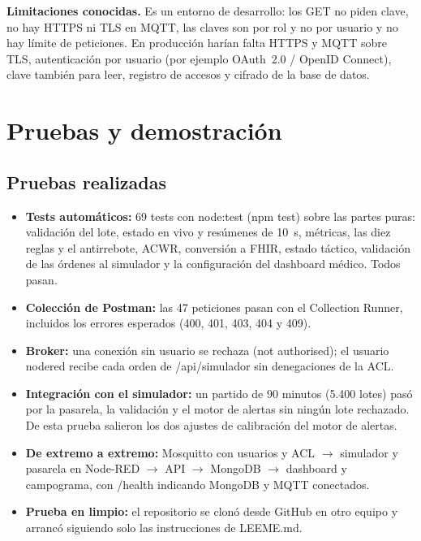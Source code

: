 \documentclass[runningheads]{llncs}
\begin{document}
\textbf{Limitaciones conocidas.} Es un entorno de desarrollo: los GET no piden clave, no hay HTTPS ni TLS en MQTT, las claves son por rol y no por usuario y no hay límite de peticiones. En producción harían falta HTTPS y MQTT sobre TLS, autenticación por usuario (por ejemplo OAuth~2.0 / OpenID Connect), clave también para leer, registro de accesos y cifrado de la base de datos.

\section{Pruebas y demostración}

\subsection{Pruebas realizadas}

\begin{itemize}
  \item \textbf{Tests automáticos:} 69 tests con node:test (npm test) sobre las partes puras: validación del lote, estado en vivo y resúmenes de 10~s, métricas, las diez reglas y el antirrebote, ACWR, conversión a FHIR, estado táctico, validación de las órdenes al simulador y la configuración del dashboard médico. Todos pasan.
  \item \textbf{Colección de Postman:} las 47 peticiones pasan con el Collection Runner, incluidos los errores esperados (400, 401, 403, 404 y 409).
  \item \textbf{Broker:} una conexión sin usuario se rechaza (not authorised); el usuario nodered recibe cada orden de /api/simulador sin denegaciones de la ACL.
  \item \textbf{Integración con el simulador:} un partido de 90 minutos (5.400 lotes) pasó por la pasarela, la validación y el motor de alertas sin ningún lote rechazado. De esta prueba salieron los dos ajustes de calibración del motor de alertas.
  \item \textbf{De extremo a extremo:} Mosquitto con usuarios y ACL $\rightarrow$ simulador y pasarela en Node-RED $\rightarrow$ API $\rightarrow$ MongoDB $\rightarrow$ dashboard y campograma, con /health indicando MongoDB y MQTT conectados.
  \item \textbf{Prueba en limpio:} el repositorio se clonó desde GitHub en otro equipo y arrancó siguiendo solo las instrucciones de LEEME.md.
\end{itemize}
\end{document}
